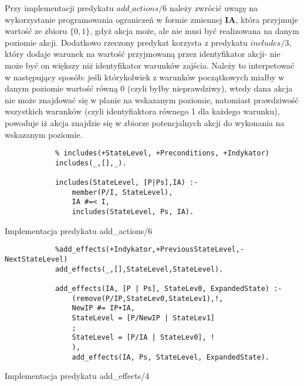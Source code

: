     Przy implementacji predykatu $add\_actions/6$ należy zwrócić uwagę na wykorzystanie programowania ograniczeń w formie zmiennej \textbf{IA}, 
    która przyjmuje wartość ze zbioru $\{0,1\}$, gdyż akcja może, ale nie musi być realizowana na danym poziomie akcji. Dodatkowo rzeczony 
    predykat korzysta z predykatu $includes/3$, który dodaje warunek na wartość przyjmowaną przez identyfikator akcji- nie może być on większy 
    niż identyfikator warunków zajścia. Należy to interpetować w następujący sposób: jeśli którykolwiek z warunków początkowych miałby w danym 
    poziomie wartość równą 0 (czyli byłby nieprawdziwy), wtedy dana akcja nie może znajdować się w planie na wskazanym poziomie, natomiast 
    prawdziwość wszystkich warunków (czyli identyfiaktora równego 1 dla każdego warunku), powoduje iż akcja znajdzie się w zbiorze potencjalnych
    akcji do wykonania na wskazanym poziomie.

    \begin{listing}[H]
        \begin{verbatim}
            % includes(+StateLevel, +Preconditions, +Indykator)
            includes(_,[],_).

            includes(StateLevel, [P|Ps],IA) :-
                member(P/I, StateLevel),
                IA #=< I,
                includes(StateLevel, Ps, IA).
    \end{verbatim}
    \caption{Implementacja predykatu add\_actions/6}
    \end{listing}

    \begin{listing}[H]
        \begin{verbatim}
            %add_effects(+Indykator,+PreviousStateLevel,-NextStateLevel)
            add_effects(_,[],StateLevel,StateLevel).

            add_effects(IA, [P | Ps], StateLev0, ExpandedState) :-
                (remove(P/IP,StateLev0,StateLev1),!,
                NewIP #= IP+IA,
                StateLevel = [P/NewIP | StateLev1]
                ;
                StateLevel = [P/IA | StateLev0], !
                ),
                add_effects(IA, Ps, StateLevel, ExpandedState).
    \end{verbatim}
    \caption{Implementacja predykatu add\_effects/4}
    \end{listing}
    
